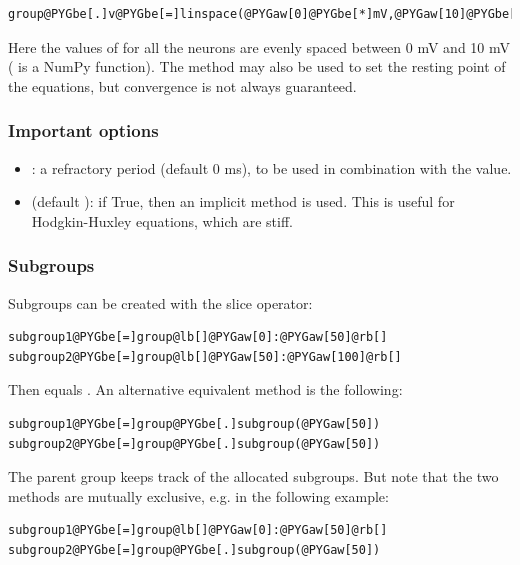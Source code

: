\documentclass[letterpaper,10pt,english]{manual}
\begin{document}
\begin{Verbatim}[commandchars=@\[\]]
group@PYGbe[.]v@PYGbe[=]linspace(@PYGaw[0]@PYGbe[*]mV,@PYGaw[10]@PYGbe[*]mV,@PYGaw[100])
\end{Verbatim}

Here the values of  for all the neurons are evenly spaced between 0 mV and 10 mV
( is a NumPy function). The method  may also be used to set the
resting point of the equations, but convergence is not always guaranteed.


\subsubsection{Important options}
\begin{itemize}
\item {} 
: a refractory period (default 0 ms), to be used in combination with the  value.

\item {} 
 (default ): if True, then an implicit method is used. This is useful
for Hodgkin-Huxley equations, which are stiff.

\end{itemize}


\subsubsection{Subgroups}

Subgroups can be created with the slice operator:

\begin{Verbatim}[commandchars=@\[\]]
subgroup1@PYGbe[=]group@lb[]@PYGaw[0]:@PYGaw[50]@rb[]
subgroup2@PYGbe[=]group@lb[]@PYGaw[50]:@PYGaw[100]@rb[]
\end{Verbatim}

Then  equals .
An alternative equivalent method is the following:

\begin{Verbatim}[commandchars=@\[\]]
subgroup1@PYGbe[=]group@PYGbe[.]subgroup(@PYGaw[50])
subgroup2@PYGbe[=]group@PYGbe[.]subgroup(@PYGaw[50])
\end{Verbatim}

The parent group keeps track of the allocated subgroups. But note that the two methods are
mutually exclusive, e.g. in the following example:

\begin{Verbatim}[commandchars=@\[\]]
subgroup1@PYGbe[=]group@lb[]@PYGaw[0]:@PYGaw[50]@rb[]
subgroup2@PYGbe[=]group@PYGbe[.]subgroup(@PYGaw[50])
\end{Verbatim}
\end{document}
